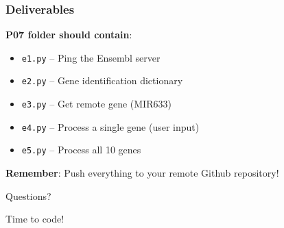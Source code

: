 \documentclass[xcolor=table]{beamer}
\begin{document}
\begin{frame}
\frametitle{Deliverables}

\textbf{P07 folder should contain}:

\vspace{0.2cm}

\begingroup\small
\begin{itemize}
\item \texttt{e1.py} -- Ping the Ensembl server
\item \texttt{e2.py} -- Gene identification dictionary
\item \texttt{e3.py} -- Get remote gene (MIR633)
\item \texttt{e4.py} -- Process a single gene (user input)
\item \texttt{e5.py} -- Process all 10 genes
\end{itemize}
\endgroup

\vspace{0.3cm}

\textbf{Remember}: Push everything to your remote Github repository!

\end{frame}


\begin{frame}
\begin{center}
\Huge{Questions?}

\vspace{1cm}

\Large{Time to code!}
\end{center}
\end{frame}
\end{document}
